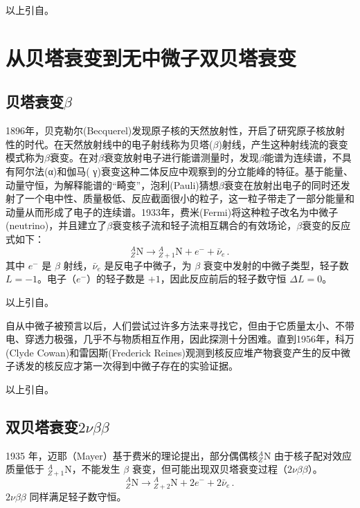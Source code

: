 \documentclass[type=master]{fduthesis}
\begin{document}
{\color{red} 以上引自}\cite{Wang2025}。





\section{从贝塔衰变到无中微子双贝塔衰变}
\subsection{贝塔衰变$\beta$}
1896年，贝克勒尔(Becquerel)发现原子核的天然放射性，开启了研究原子核放射性的时代。在天然放射线中的电子射线称为贝塔($\beta$)射线，产生这种射线流的衰变模式称为$\beta$衰变。在对$\beta$衰变放射电子进行能谱测量时，发现$\beta$能谱为连续谱，不具有阿尔法(α)和伽马( γ)衰变这种二体反应中观察到的分立能峰的特征。基于能量、动量守恒，为解释能谱的“畸变”，泡利(Pauli)猜想$\beta$衰变在放射出电子的同时还发射了一个电中性、质量极低、反应截面很小的粒子，这一粒子带走了一部分能量和动量从而形成了电子的连续谱。1933年，费米(Fermi)将这种粒子改名为中微子(neutrino)，并且建立了$\beta$衰变核子流和轻子流相互耦合的有效场论\cite{Fermi1933,Fermi1934a,Fermi1934b}，$\beta$衰变的反应式如下：
\[{}^{A}_{Z}\mathrm{N} \rightarrow {}^{A}_{Z+1}\mathrm{N} + e^{-} + \bar{\nu}_{e} \, .\]
其中 $e^{-}$ 是 $\beta$ 射线，$\bar{\nu}_{e}$ 是反电子中微子，为 $\beta$ 衰变中发射的中微子类型，轻子数 $L=-1$。电子（$e^{-}$）的轻子数是 $+1$，因此反应前后的轻子数守恒 $\Delta L = 0$。

{\color{red} 以上引自}\cite{Wang2025}。

自从中微子被预言以后，人们尝试过许多方法来寻找它，但由于它质量太小、不带电、穿透力极强，几乎不与物质相互作用，因此探测十分困难。直到1956年，科万(Clyde Cowan)和雷因斯(Frederick Reines)观测到核反应堆产物衰变产生的反中微子诱发的核反应才第一次得到中微子存在的实验证据\cite{Cowan1956}。

{\color{green} 以上引自}\cite{Ma2020Majorana}。




\subsection{双贝塔衰变$2\nu\beta\beta$}
1935 年，迈耶（Mayer）基于费米的理论提出，部分偶偶核${}^{A}_{Z}\mathrm{N}$ 由于核子配对效应质量低于 ${}^{A}_{Z+1}\mathrm{N}$，不能发生 $\beta$ 衰变，但可能出现双贝塔衰变过程（$2\nu\beta\beta$）\cite{Goeppert1935}。
\[{}^{A}_{Z}\mathrm{N} \rightarrow {}^{A}_{Z+2}\mathrm{N} + 2e^{-} + 2\bar{\nu}_{e} \, .\]$2\nu\beta\beta$ 同样满足轻子数守恒。
\end{document}
